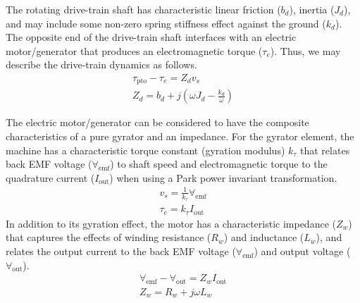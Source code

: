 \documentclass[twocolumn]{autart}
\newcommand{\rc}[1]{\textcolor{red}{#1}}
\begin{document}
The rotating drive-train shaft has characteristic linear friction ($b_d$), inertia ($J_d$), and may include some non-zero spring stiffness effect against the ground ($k_d$).
The opposite end of the drive-train shaft interfaces with an electric motor/generator that produces an electromagnetic torque ($\tau_e$).
Thus, we may describe the drive-train dynamics as follows.
%
\begin{subequations}
        \begin{gather}
                \tau_{\textrm{pto}} - \tau_e = Z_d v_s \\
                Z_d = b_d + j \left( \omega J_d - \frac{k_d}{\omega} \right)
        \end{gather}
\end{subequations}

The electric motor/generator can be considered to have the composite characteristics of a pure gyrator and an impedance.
For the gyrator element, the machine has a characteristic torque constant (gyration modulus) $k_\tau$ that relates back EMF voltage ($\forall_{\textrm{emf}}$) to shaft speed and electromagnetic torque to the quadrature current ($I_{\textrm{out}}$) when using a Park power invariant transformation.
%
\begin{subequations}
        \begin{gather}
                v_s = \frac{1}{k_\tau}\forall_{\textrm{emf}} \\
                \tau_e = k_\tau I_{\textrm{out}}
        \end{gather}
\end{subequations}
%
In addition to its gyration effect, the motor has a characteristic impedance ($Z_w$) that captures the effects of winding resistance ($R_w$) and inductance ($L_w$), and relates the output current to the back EMF voltage ($\forall_{\textrm{emf}}$) and output voltage ($\forall_{\textrm{out}}$).
%
\begin{subequations}
        \begin{gather}
                \forall_{\textrm{emf}} - \forall_{\textrm{out}} = Z_w I_{\textrm{out}}\\
                Z_w = R_w + j \omega L_w \label{eq:winding_impedance}
        \end{gather}
\end{subequations}
\end{document}
